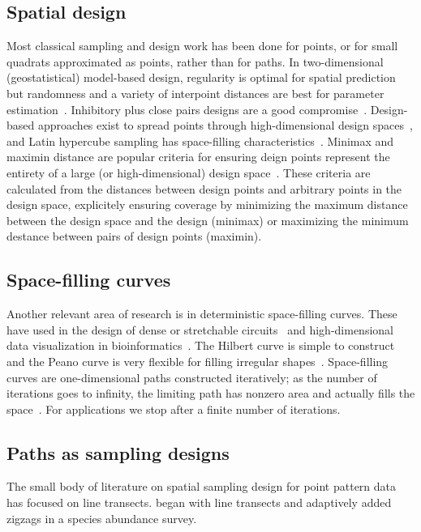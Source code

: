\documentclass[review]{elsarticle}
\begin{document}
\subsection{Spatial design}

Most classical sampling and design work has been done for points, or for small
quadrats approximated as points, rather than for paths. In two-dimensional
(geostatistical) model-based design, regularity is optimal for spatial
prediction but randomness and a variety of interpoint distances are best for
parameter estimation~\citep{diggle}. Inhibitory plus close pairs designs are a
good compromise~\citep{chipetaetal2017}. Design-based approaches exist to
spread points through high-dimensional design spaces~\citep{borkowskipiepel},
and Latin hypercube sampling has space-filling
characteristics~\citep{mckayetal,husslageetal}. Minimax and maximin distance
are popular criteria for ensuring deign points represent the entirety of a
large (or high-dimensional) design space~\citep{johnson}. These criteria
are calculated from the distances between design points and arbitrary
points in the design space, explicitely ensuring coverage by minimizing the
maximum distance between the design space and the design (minimax) or
maximizing the minimum destance between pairs of design points (maximin).


\subsection{Space-filling curves}

Another relevant area of research is in deterministic space-filling curves.
These have used in the design of dense or stretchable
circuits~\citep{ogorzalek,mazhang} and high-dimensional data visualization
in bioinformatics~\citep{hilbertvis}. The Hilbert curve is simple to construct
and the Peano curve is very flexible for filling irregular
shapes~\citep{fanetal}. Space-filling curves are one-dimensional paths
constructed iteratively; as the number of iterations goes to infinity, the
limiting path has nonzero area and actually fills the space~\citep{sagan}. For
applications we stop after a finite number of iterations.


\subsection{Paths as sampling designs}

The small body of literature on spatial sampling design for point pattern
data has focused on line transects. \citet{pollard} began with line transects
and adaptively added zigzags in a species abundance survey.
\end{document}
